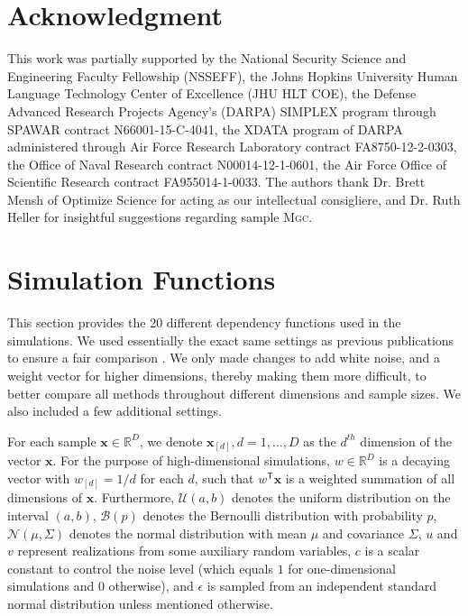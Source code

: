 \documentclass[11pt]{article}
\providecommand{\sct}[1]{{\normalfont\textsc{#1}}}
\providecommand{\mb}[1]{\boldsymbol{#1}}
\providecommand{\mc}[1]{\mathcal{#1}}
\newcommand{\Real}{\mathbb{R}}
\newcommand{\T}{^{\ensuremath{\mathsf{T}}}}           %
\newcommand{\Mgc}{\sct{Mgc}}
\newcommand{\mbx}{\ensuremath{\mb{x}}}
\begin{document}
\clearpage
\pagestyle{plain}




\section*{Acknowledgment}
This work was partially supported by the
%
National Security Science and Engineering Faculty Fellowship (NSSEFF),
%
the Johns Hopkins University Human Language Technology Center of Excellence (JHU HLT COE),  the
%
Defense Advanced Research Projects Agency's (DARPA) SIMPLEX program through SPAWAR contract N66001-15-C-4041,
%
the XDATA program of DARPA administered through Air Force Research Laboratory contract FA8750-12-2-0303,
%
the Office of Naval Research contract N00014-12-1-0601,
%
the Air Force Office of Scientific Research contract FA955014-1-0033. The authors thank Dr. Brett Mensh of Optimize Science for acting as our intellectual consigliere, and Dr. Ruth Heller for insightful suggestions regarding sample \Mgc.

\clearpage
\appendix
\setcounter{figure}{0}
\renewcommand\thefigure{A\arabic{figure}}

\section{Simulation Functions}
\label{appen:function}

This section provides the $20$ different dependency functions used in the simulations.  We used essentially the exact same settings as previous publications to ensure a fair comparison \cite{SzekelyRizzoBakirov2007, SimonTibshirani2012, SimonTibshirani2012, GorfineHellerHeller2012}.  We only made changes to add white noise, and a weight vector for higher dimensions, thereby making them more difficult, to better compare all methods throughout different dimensions and sample sizes. We also included a few additional settings.

For each sample $\mb{x} \in \Real^{D}$, we denote $\mb{x}_{[d]}, d=1,\ldots,D$ as the $d^{th}$ dimension of the vector \mbx. For the purpose of high-dimensional simulations, $w \in \Real^{D}$ is a decaying vector with $w_{[d]}=1/d$ for each $d$, such that $w\T \mb{x}$ is a 
weighted summation of all dimensions of \mbx. %
Furthermore, $\mc{U}(a,b)$ denotes the uniform distribution on the interval $(a,b)$, $\mc{B}(p)$ denotes the Bernoulli distribution with probability $p$, $\mc{N}(\mu,{\Sigma})$ denotes the normal distribution with mean ${\mu}$ and covariance ${\Sigma}$, 
$u$ and $v$ represent realizations from some auxiliary random variables, $c$ is a scalar constant to control the noise level (which equals $1$ for one-dimensional simulations and $0$ otherwise), and $\epsilon$ is sampled from an independent standard normal distribution unless mentioned otherwise.
\end{document}
